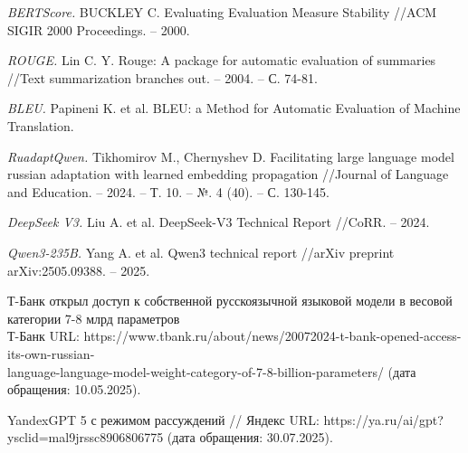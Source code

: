 \documentclass{article}
\begin{document}
\begin{thebibliography}{99}
\textit{BERTScore.}
BUCKLEY C. Evaluating Evaluation Measure Stability //ACM SIGIR 2000 Proceedings. – 2000.

\textit{ROUGE.}
Lin C. Y. Rouge: A package for automatic evaluation of summaries //Text summarization branches out. – 2004. – С. 74-81.

\textit{BLEU.}
Papineni K. et al. BLEU: a Method for Automatic Evaluation of Machine Translation.

\textit{RuadaptQwen.}
Tikhomirov M., Chernyshev D. Facilitating large language model russian adaptation with learned embedding propagation //Journal of Language and Education. – 2024. – Т. 10. – №. 4 (40). – С. 130-145.

\textit{DeepSeek V3.}
Liu A. et al. DeepSeek-V3 Technical Report //CoRR. – 2024.

\textit{Qwen3-235B.}
Yang A. et al. Qwen3 technical report //arXiv preprint arXiv:2505.09388. – 2025.

Т-Банк открыл доступ к собственной русскоязычной языковой модели в весовой категории 7-8 млрд параметров\\ Т-Банк URL: https://www.tbank.ru/about/news/20072024-t-bank-opened-access-its-own-russian-\\language-language-model-weight-category-of-7-8-billion-parameters/ (дата обращения: 10.05.2025).

YandexGPT 5 с режимом рассуждений // Яндекс URL: https://ya.ru/ai/gpt?ysclid=mal9jrssc8906806775 (дата обращения: 30.07.2025).

\end{thebibliography}
\end{document}
